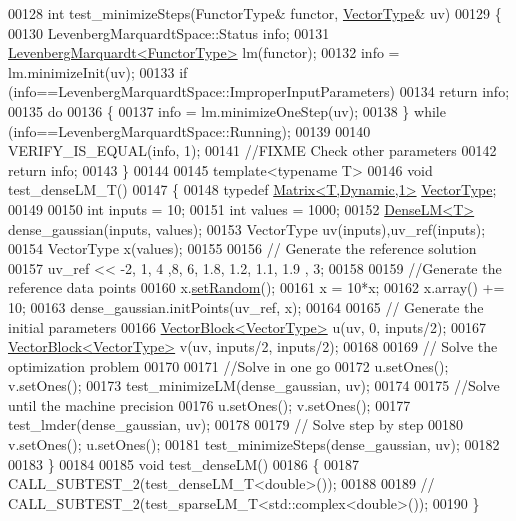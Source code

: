 \begin{DoxyCode}
00128 \textcolor{keywordtype}{int} test\_minimizeSteps(FunctorType& functor, \hyperlink{group___core___module}{VectorType}& uv)
00129 \{
00130   LevenbergMarquardtSpace::Status info;   
00131   \hyperlink{class_eigen_1_1_levenberg_marquardt}{LevenbergMarquardt<FunctorType>} lm(functor);
00132   info = lm.minimizeInit(uv);
00133   \textcolor{keywordflow}{if} (info==LevenbergMarquardtSpace::ImproperInputParameters)
00134       \textcolor{keywordflow}{return} info;
00135   \textcolor{keywordflow}{do} 
00136   \{
00137     info = lm.minimizeOneStep(uv);
00138   \} \textcolor{keywordflow}{while} (info==LevenbergMarquardtSpace::Running);
00139   
00140   VERIFY\_IS\_EQUAL(info, 1);
00141   \textcolor{comment}{//FIXME Check other parameters}
00142   \textcolor{keywordflow}{return} info;
00143 \}
00144 
00145 \textcolor{keyword}{template}<\textcolor{keyword}{typename} T>
00146 \textcolor{keywordtype}{void} test\_denseLM\_T()
00147 \{
00148   \textcolor{keyword}{typedef} \hyperlink{group___core___module_class_eigen_1_1_matrix}{Matrix<T,Dynamic,1>} \hyperlink{group___core___module}{VectorType};
00149   
00150   \textcolor{keywordtype}{int} inputs = 10; 
00151   \textcolor{keywordtype}{int} values = 1000; 
00152   \hyperlink{struct_dense_l_m}{DenseLM<T>} dense\_gaussian(inputs, values);
00153   VectorType uv(inputs),uv\_ref(inputs);
00154   VectorType x(values);
00155   
00156   \textcolor{comment}{// Generate the reference solution }
00157   uv\_ref << -2, 1, 4 ,8, 6, 1.8, 1.2, 1.1, 1.9 , 3;
00158   
00159   \textcolor{comment}{//Generate the reference data points}
00160   x.\hyperlink{class_eigen_1_1_plain_object_base_af0e576a0e1aefc9ee346de44cc352ba3}{setRandom}();
00161   x = 10*x;
00162   x.array() += 10;
00163   dense\_gaussian.initPoints(uv\_ref, x);
00164   
00165   \textcolor{comment}{// Generate the initial parameters }
00166   \hyperlink{group___core___module_class_eigen_1_1_vector_block}{VectorBlock<VectorType>} u(uv, 0, inputs/2); 
00167   \hyperlink{group___core___module_class_eigen_1_1_vector_block}{VectorBlock<VectorType>} v(uv, inputs/2, inputs/2);
00168   
00169   \textcolor{comment}{// Solve the optimization problem}
00170   
00171   \textcolor{comment}{//Solve in one go}
00172   u.setOnes(); v.setOnes();
00173   test\_minimizeLM(dense\_gaussian, uv);
00174   
00175   \textcolor{comment}{//Solve until the machine precision}
00176   u.setOnes(); v.setOnes();
00177   test\_lmder(dense\_gaussian, uv); 
00178   
00179   \textcolor{comment}{// Solve step by step}
00180   v.setOnes(); u.setOnes();
00181   test\_minimizeSteps(dense\_gaussian, uv);
00182   
00183 \}
00184 
00185 \textcolor{keywordtype}{void} test\_denseLM()
00186 \{
00187   CALL\_SUBTEST\_2(test\_denseLM\_T<double>());
00188   
00189   \textcolor{comment}{// CALL\_SUBTEST\_2(test\_sparseLM\_T<std::complex<double>());}
00190 \}
\end{DoxyCode}
